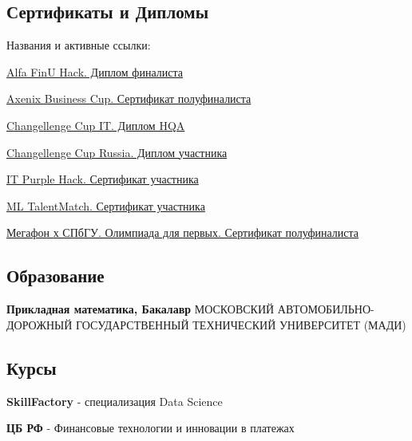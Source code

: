 \documentclass{article}
\begin{document}
\begin{minipage}{0.7125\textwidth}
\begin{tcolorbox}[height=0.8\textheight, grow to left by=0.55cm,colframe=white,colback=white]
            \subsection*{\Large{Сертификаты и Дипломы}}
            {Названия и активные ссылки:}
            {\begin{compactitem}[*]
                \item{\href{https://disk.yandex.ru/i/u70FDtYfRM2Xqg}{Alfa FinU Hack. Диплом финалиста}}
                \item{\href{https://disk.yandex.ru/i/zvw_n36lRkEEbQ}{Axenix Business Cup. Сертификат полуфиналиста}}
                \item{\href{https://disk.yandex.ru/i/OpMpHdrC_FpKSw}{Changellenge Cup IT. Диплом HQA}}
                \item{\href{https://disk.yandex.ru/i/iD6kRkfoQEhBUw}{Changellenge Cup Russia. Диплом участника}}
                \item{\href{https://disk.yandex.ru/i/PZdSphoZOyIMpg}{IT Purple Hack. Сертификат участника}}
                \item{\href{https://disk.yandex.ru/i/5ZDqyT28396w3g}{ML TalentMatch. Сертификат участника}}
                \item{\href{https://disk.yandex.ru/i/bd6KZTIkSCeq2w}{Мегафон х СПбГУ. Олимпиада для первых. Сертификат полуфиналиста}}
            \end{compactitem}
            }

            \subsection*{\Large{Образование}}
            \large{\textbf{\vspace{1mm}Прикладная математика, Бакалавр}}\hfill\hfill
            \newline
            \small{МОСКОВСКИЙ АВТОМОБИЛЬНО-ДОРОЖНЫЙ ГОСУДАРСТВЕННЫЙ ТЕХНИЧЕСКИЙ УНИВЕРСИТЕТ (МАДИ)}

            \subsection*{\Large{Курсы}}
            {\begin{compactitem}[]
                \item{\normalsize{\textbf{SkillFactory}{ - специализация Data Science}}}
                \newline
                \item{\normalsize{\textbf{ЦБ РФ}{ - Финансовые технологии и инновации в платежах}}}
            \end{compactitem}
            }

        \end{tcolorbox}
    \end{minipage}
\end{document}
